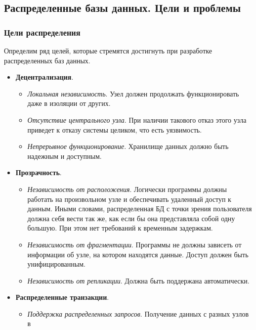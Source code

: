 \subsection{Распределенные базы данных. Цели и проблемы}

\subsubsection{Цели распределения}

Определим ряд целей, которые стремятся достигнуть при разработке распределенных баз данных.

\begin{itemize}
	\item \textbf{Децентрализация}.
	      \begin{itemize}
		      \item \textit{Локальная независимость}. Узел должен продолжать функционировать даже в
		            изоляции от других.
		      \item \textit{Отсутствие центрального узла}. При наличии такового отказ этого узла
		            приведет к отказу системы целиком, что есть уязвимость.
		      \item \textit{Непрерывное функционирование}. Хранилище данных должно быть надежным и
		            доступным.
	      \end{itemize}
	\item \textbf{Прозрачность}.
	      \begin{itemize}
		      \item \textit{Независимость от расположения}. Логически программы должны работать на
		            произвольном узле и обеспечивать удаленный доступ к данным. Иными словами, распределенная БД с
		            точки зрения пользователя должна себя вести так же, как если бы она представляла собой одну
		            большую. При этом нет требований к временным задержкам.
		      \item \textit{Независимость от фрагментации}. Программы не должны зависеть от
		            информации об узле, на котором находятся данные. Доступ должен быть унифицированным.
		      \item \textit{Независимость от репликации}. Должна быть поддержана автоматически.
	      \end{itemize}
	\item \textbf{Распределенные транзакции}.
	      \begin{itemize}
		      \item \textit{Поддержка распределенных запросов}. Получение данных с разных узлов в

\end{itemize}
\end{itemize}
